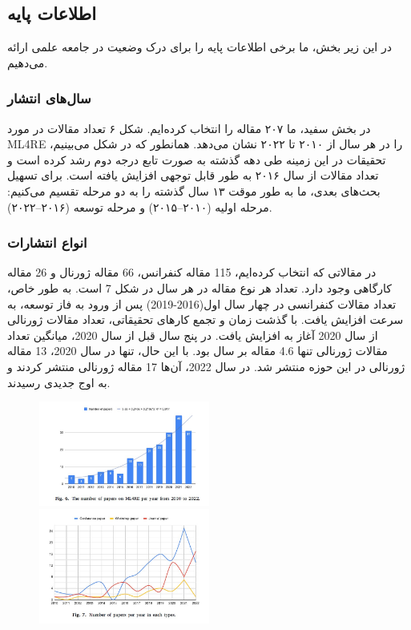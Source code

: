 \documentclass[a4paper,10pt]{article}
\begin{document}
        \subsection{اطلاعات پایه}

            در این زیر بخش، ما برخی اطلاعات پایه را برای درک وضعیت در جامعه علمی ارائه می‌دهیم.
        
            \subsubsection{سال‌های انتشار}
            
                در بخش سفید، ما ۲۰۷ مقاله را انتخاب کرده‌ایم. شکل ۶ تعداد مقالات در مورد ML4RE را در هر سال از ۲۰۱۰ تا ۲۰۲۲ نشان می‌دهد. همانطور که در شکل می‌بینیم، تحقیقات در این زمینه طی دهه گذشته به صورت تابع درجه دوم رشد کرده است و تعداد مقالات از سال ۲۰۱۶ به طور قابل توجهی افزایش یافته است. برای تسهیل بحث‌های بعدی، ما به طور موقت ۱۳ سال گذشته را به دو مرحله تقسیم می‌کنیم: مرحله اولیه (۲۰۱۰–۲۰۱۵) و مرحله توسعه (۲۰۱۶–۲۰۲۲).

            \subsubsection{انواع انتشارات}

                در مقالاتی که انتخاب کرده‌ایم، 115 مقاله کنفرانس، 66 مقاله ژورنال و 26 مقاله کارگاهی وجود دارد. تعداد هر نوع مقاله در هر سال در شکل 7 است. به طور خاص، تعداد مقالات کنفرانسی در چهار سال اول(2016-2019) پس از ورود به فاز توسعه، به سرعت افزایش یافت. با گذشت زمان و تجمع کارهای تحقیقاتی، تعداد مقالات ژورنالی از سال 2020 آغاز به افزایش یافت. در پنج سال قبل از سال 2020، میانگین تعداد مقالات ژورنالی تنها 4.6 مقاله بر سال بود. با این حال، تنها در سال 2020، 13 مقاله ژورنالی در این حوزه منتشر شد. در سال 2022، آن‌ها 17 مقاله ژورنالی منتشر کردند و به اوج جدیدی رسیدند.

                \begin{figure}
                    \centering
                    \includegraphics[width=0.5\textwidth]{Image/fig-6.jpg}
                    \includegraphics[width=0.5\textwidth]{Image/fig-7.jpg}
                \end{figure}
\end{document}
